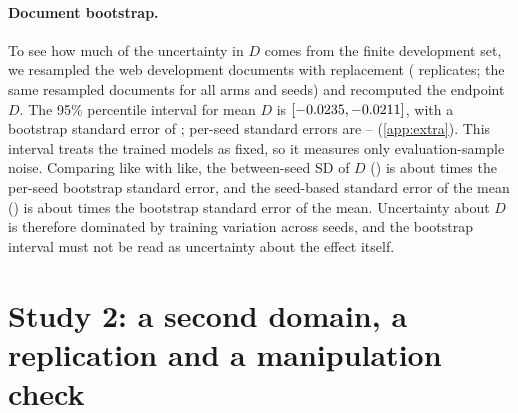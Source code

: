 \documentclass[11pt]{article}
\begin{document}
\paragraph{Document bootstrap.} To see how much of the uncertainty in $D$ comes from the finite development set,
we resampled the \nDocsWeb{} web development documents with replacement (\bootB{} replicates; the same resampled
documents for all arms and seeds) and recomputed the endpoint $D$. The 95\% percentile interval for mean $D$ is
$[-0.0235, -0.0211]$, with a bootstrap standard error of \bootSE; per-seed standard errors are
\bootSeedSElo--\bootSeedSEhi{} (\cref{app:extra}). This interval treats the trained models as fixed, so it
measures only evaluation-sample noise. Comparing like with like, the between-seed SD of $D$ (\Dsd) is about
\bootRatioSeed{} times the per-seed bootstrap standard error, and the seed-based standard error of the mean
(\seedSEmean) is about \bootRatioMean{} times the bootstrap standard error of the mean. Uncertainty about $D$ is
therefore dominated by training variation across seeds, and the bootstrap interval must not be read as
uncertainty about the effect itself.

\section{Study 2: a second domain, a replication and a manipulation check}
\label{sec:study2}
\end{document}
